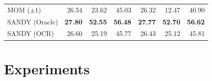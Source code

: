 \documentclass[10pt,twocolumn,letterpaper]{article}
\begin{document}
\begin{table}[t]
\begin{tabular}{@{}lrrr|rrr@{}}
MOM ($\pm 1$)   & 26.54                                                                                                    &23.62                                                                                                 & 45.03                                         & 26.32                                                                                                     & 12.47                                                                                                  &40.90                                         \\
SANDY (Oracle)      & \textbf{27.80}                                                                                                  & \textbf{52.55}                                                                                                & \textbf{56.48}                                        & \textbf{27.77}                                                                                                   & \textbf{52.70}                                                                                               & \textbf{56.62}                                        \\
SANDY (OCR)    & 26.60     & 25.19 & 45.77  & 26.43         & 25.12    & 45.81         \\ \bottomrule
\end{tabular}
\end{table}

\section{Experiments}
\end{document}

